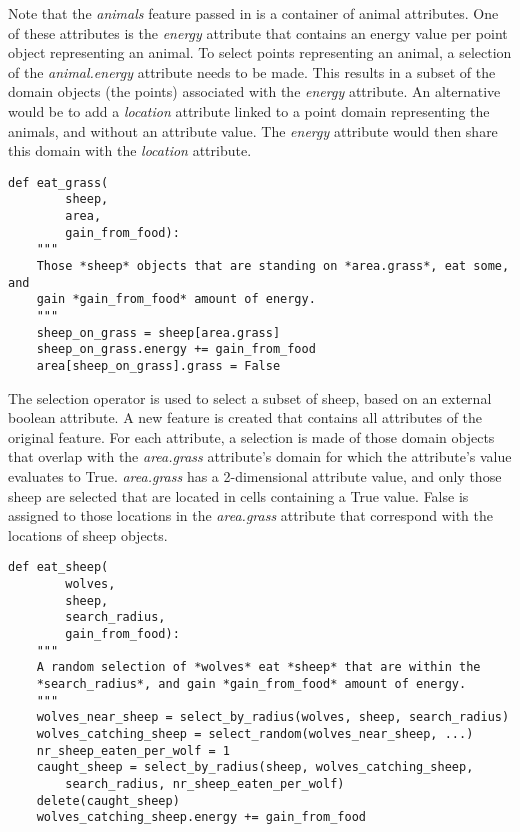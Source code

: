 \documentclass[10pt, a4paper]{article}
\begin{document}
Note that the \emph{animals} feature passed in is a container of animal attributes. One of these attributes is the \emph{energy} attribute that contains an energy value per point object representing an animal. To select points representing an animal, a selection of the \emph{animal.energy} attribute needs to be made. This results in a subset of the domain objects (the points) associated with the \emph{energy} attribute. An alternative would be to add a \emph{location} attribute linked to a point domain representing the animals, and without an attribute value. The \emph{energy} attribute would then share this domain with the \emph{location} attribute.

\begin{lstlisting}
def eat_grass(
        sheep,
        area,
        gain_from_food):
    """
    Those *sheep* objects that are standing on *area.grass*, eat some, and
    gain *gain_from_food* amount of energy.
    """
    sheep_on_grass = sheep[area.grass]
    sheep_on_grass.energy += gain_from_food
    area[sheep_on_grass].grass = False
\end{lstlisting}

The selection operator is used to select a subset of sheep, based on an external boolean attribute. A new feature is created that contains all attributes of the original feature. For each attribute, a selection is made of those domain objects that overlap with the \emph{area.grass} attribute's domain for which the attribute's value evaluates to True. \emph{area.grass} has a 2-dimensional attribute value, and only those sheep are selected that are located in cells containing a True value. False is assigned to those locations in the \emph{area.grass} attribute that correspond with the locations of sheep objects.

\begin{lstlisting}
def eat_sheep(
        wolves,
        sheep,
        search_radius,
        gain_from_food):
    """
    A random selection of *wolves* eat *sheep* that are within the
    *search_radius*, and gain *gain_from_food* amount of energy.
    """
    wolves_near_sheep = select_by_radius(wolves, sheep, search_radius)
    wolves_catching_sheep = select_random(wolves_near_sheep, ...)
    nr_sheep_eaten_per_wolf = 1
    caught_sheep = select_by_radius(sheep, wolves_catching_sheep,
        search_radius, nr_sheep_eaten_per_wolf)
    delete(caught_sheep)
    wolves_catching_sheep.energy += gain_from_food
\end{lstlisting}
\end{document}

